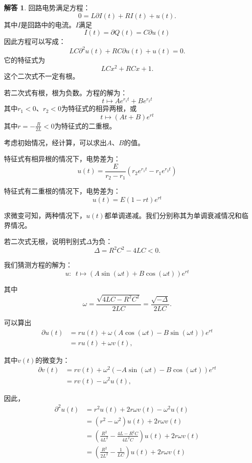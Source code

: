\documentclass[12pt,UTF8]{ctexbook}
\theoremstyle{definition}
\newtheorem*{so}{解答}
\theoremstyle{plain}
\begin{document}
\begin{so}
    回路电势满足方程：
    $$ 0 = L\partial I(t) + RI(t) + u(t).$$
    其中$I$是回路中的电流。$I$满足
    $$ I(t) = \partial Q(t) = C\partial u(t) $$
    因此方程可以写成：
    $$ LC\partial^2 u(t) + RC\partial u(t) + u(t) = 0.$$
    它的特征式为
    $$ LC x^2 + RC x + 1.$$
    这个二次式不一定有根。

    若二次式有根，根为负数。方程的解为：
    $$ t \mapsto Ae^{r_1t} + Be^{r_2t} $$
    其中$r_1<0$、$r_2<0$为特征式的相异两根，或
    $$ t \mapsto (At + B)e^{rt} $$
    其中$r = -\frac{R}{2L} < 0$为特征式的二重根。

    考虑初始情况，经计算，可以求出$A$、$B$的值。

    特征式有相异根的情况下，电势差为：
    $$ u(t) = \frac{E}{r_2 - r_1}\left(r_2e^{r_1t} - r_1e^{r_2t}\right) $$ 

    特征式有二重根的情况下，电势差为：
    $$ u(t) =  E(1 - rt)e^{rt}$$

    求微变可知，两种情况下，$u(t)$都单调递减。我们分别称其为单调衰减情况和临界情况。

    若二次式无根，说明判别式$\Delta$为负：
    $$ \Delta = R^2C^2 - 4LC < 0.$$

    我们猜测方程的解为：
    $$ u: \,\,\,t \mapsto \left(A\sin{(\omega t)} + B\cos{(\omega t)}\right)e^{rt} $$

    其中
    $$\omega = \frac{\sqrt{4LC - R^2C^2}}{2LC} = \frac{\sqrt{-\Delta}}{2LC}. $$

    可以算出
    \begin{align*}
        \partial u(t) &= ru(t) + \omega \left(A\cos{(\omega t)} - B\sin{(\omega t)}\right)e^{rt} \\
        &= ru(t) + \omega v(t),
    \end{align*}

    其中$v(t)$的微变为：
    \begin{align*}
        \partial v(t) &= rv(t) + \omega^2 \left(- A\sin{(\omega t)} - B\cos{(\omega t)}\right)e^{rt} \\
        &= rv(t) - \omega^2 u(t),
    \end{align*}

    因此，
    \begin{align*}        
        \partial^2 u(t) &= r^2u(t) + 2r\omega v(t) - \omega^2u(t) \\
        &= (r^2 - \omega^2 )u(t) + 2r\omega v(t) \\
        &= \left(\frac{R^2}{4L^2} - \frac{4L - R^2C}{4L^2C}\right)u(t) + 2r\omega v(t)\\
        &= \left(\frac{R^2}{2L^2} - \frac{1}{LC} \right)u(t) + 2r\omega v(t)
    \end{align*}


\end{so}
\end{document}
